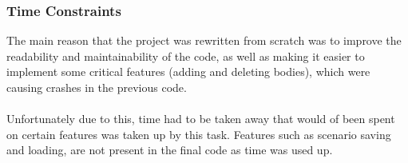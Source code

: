 \subsubsection{Time Constraints}
The main reason that the project was rewritten from scratch was to improve the readability and maintainability of the code, as well as making it easier to implement some critical features (adding and deleting bodies), which were causing crashes in the previous code.

\paragraph{}
Unfortunately due to this, time had to be taken away that would of been spent on certain features was taken up by this task. Features such as scenario saving and loading, are not present in the final code as time was used up.